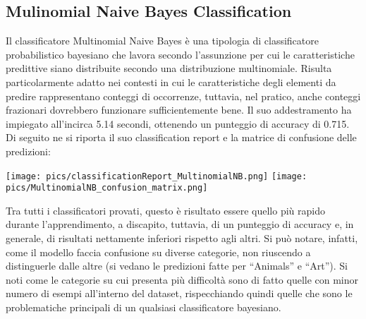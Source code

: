 \documentclass[12pt,oneside]{article}
\begin{document}
    \begin{enumerate}
    \subsection{Mulinomial Naive Bayes Classification}
    \begin{justify}
        Il classificatore Multinomial Naive Bayes è una tipologia di classificatore probabilistico bayesiano che lavora secondo l’assunzione per cui le caratteristiche predittive siano distribuite secondo una distribuzione multinomiale. Risulta particolarmente adatto nei contesti in cui le caratteristiche degli elementi da predire rappresentano conteggi di occorrenze, tuttavia, nel pratico, anche conteggi frazionari dovrebbero funzionare sufficientemente bene.
        Il suo addestramento ha impiegato all’incirca 5.14 secondi, ottenendo un punteggio di accuracy di 0.715. Di seguito ne si riporta il suo classification report e la matrice di confusione delle predizioni:
    \end{justify}
    \texttt{[image: pics/classificationReport\_MultinomialNB.png]} 
    \texttt{[image: pics/MultinomialNB\_confusion\_matrix.png]}

    \begin{justify}
        Tra tutti i classificatori provati, questo è risultato essere quello più rapido durante l’apprendimento, a discapito, tuttavia, di un punteggio di accuracy e, in generale, di risultati nettamente inferiori rispetto agli altri. Si può notare, infatti, come il modello faccia confusione su diverse categorie, non riuscendo a distinguerle dalle altre (si vedano le predizioni fatte per “Animals” e “Art”). Si noti come le categorie su cui presenta più difficoltà sono di fatto quelle con minor numero di esempi all’interno del dataset, rispecchiando quindi quelle che sono le problematiche principali di un qualsiasi classificatore bayesiano.
    \end{justify}
    \end{enumerate}
    
\end{document}
